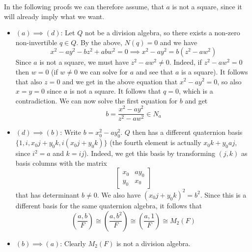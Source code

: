 \documentclass[a4paper, 12pt]{article}
\newcommand{\iso}{\cong}
\begin{document}
In the following proofs we can therefore assume, that $a$ is not a square, since it will already imply what we want.

\begin{itemize}
	\item \underline{$(a) \implies (d)$}: Let $Q$ not be a division algebra, so there exists a non-zero non-invertible $q \in Q$. By the above, $N(q) = 0$ and we have
	\[
	x^2 - ay^2 - bz^2 + abw^2 = 0 \implies x^2 - ay^2 = b(z^2 - aw^2)
	\]
	Since $a$ is not a square, we must have $z^2 - aw^2 \neq 0$. Indeed, if $z^2 - aw^2 = 0$ then $w = 0$ (if $w \neq 0$ we can solve for $a$ and see that $a$ is a square). It follows that also $z = 0$ and we get in the above equation that $x^2 - ay^2 = 0$, so also $x = y = 0$ since $a$ is not a square. It follows that $q = 0$, which is a contradiction. We can now solve the first equation for $b$ and get
	\[
	b = \frac{x^2 - ay^2}{z^2 - aw^2} \in N_a
	\]
	\item \underline{$(d) \implies (b)$}: Write $b = x_0^2 - a y_0^2$. $Q$ then has a different quaternion basis $\lbrace 1, i, x_0j + y_0k, i(x_0j + y_0k) \rbrace$ (the fourth element is actually $x_0k + y_0aj$, since $i^2 = a$ and $k = ij$). Indeed, we get this basis by transforming $(j, k)$ as basis columns with the matrix
	\[
	\begin{bmatrix}
	x_0 & ay_0 \\
	y_0 & x_0
	\end{bmatrix}
	\]
	that has determinant $b \neq 0$. We also have $(x_0j + y_0 k)^2 = b^2$. Since this is a different basis for the same quaternion algebra, it follows that
	\[
	\left(\frac{a, b}{F}\right) \iso \left(\frac{a, b^2}{F}\right) \iso \left(\frac{a, 1}{F}\right) \iso M_2(F)
	\]
	\item \underline{$(b) \implies (a)$}: Clearly $M_2(F)$ is not a division algebra.
\end{itemize}
\end{document}

